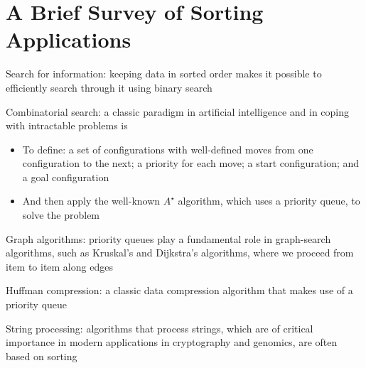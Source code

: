 \documentclass[8pt,a4paper,compress]{beamer}
\begin{document}
\section{A Brief Survey of Sorting Applications}
\begin{frame}[fragile]
\pause

Search for information: keeping data in sorted order makes it possible to efficiently search through it using binary search

\pause
\bigskip

Combinatorial search: a classic paradigm in artificial intelligence and in coping with intractable problems is
\begin{itemize}
\pause
\item To define: a set of configurations with well-defined moves from one configuration to the next; a priority for each move; a start configuration; and a goal configuration  

\pause
\item And then apply the well-known $A^\star$ algorithm, which uses a priority queue, to solve the problem
\end{itemize}

\pause
\bigskip

Graph algorithms: priority queues play a fundamental role in graph-search algorithms, such as Kruskal's and Dijkstra's algorithms, where we proceed from item to item along edges

\pause
\bigskip

Huffman compression: a classic data compression algorithm that makes use of a priority queue

\pause
\bigskip

String processing: algorithms that process strings, which are of critical importance in modern applications in cryptography and genomics, are often based on sorting
\end{frame}
\end{document}
